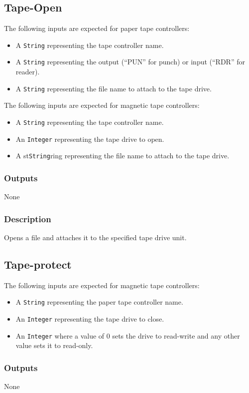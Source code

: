 \documentclass[10pt, openany]{book}
\newcommand{\datatype}[1]{\texttt{#1}}
\begin{document}
\subsection{Tape-Open}
The following inputs are expected for paper tape controllers:
\begin{itemize}
  \item A \datatype{String} representing the tape controller name.
  \item A \datatype{String} representing the output (``PUN'' for punch) or input (``RDR'' for reader).
  \item A \datatype{String} representing the file name to attach to the tape drive.
\end{itemize}
The following inputs are expected for magnetic tape controllers:
\begin{itemize}
  \item A \datatype{String} representing the tape controller name.
  \item An \datatype{Integer} representing the tape drive to open.
  \item A st\datatype{String}ring representing the file name to attach to the tape drive.
\end{itemize}
\subsubsection{Outputs}
None
\subsubsection{Description}
Opens a file and attaches it to the specified tape drive unit.

\subsection{Tape-protect}
The following inputs are expected for magnetic tape controllers:
\begin{itemize}
  \item A \datatype{String} representing the paper tape controller name.
  \item An \datatype{Integer} representing the tape drive to close.
  \item An \datatype{Integer} where a value of 0 sets the drive to read-write and any other value sets it to read-only.
\end{itemize}
\subsubsection{Outputs}
None
\end{document}
